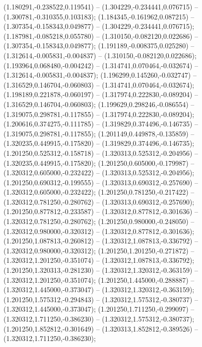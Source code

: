  (1.180291,-0.238522,0.119541) -- (1.304229,-0.234441,0.076715) -- (1.300781,-0.310355,0.103183);
 (1.184345,-0.161962,0.087215) -- (1.307354,-0.158343,0.049877) -- (1.304229,-0.234441,0.076715);
 (1.187981,-0.085218,0.055780) -- (1.310150,-0.082120,0.022686) -- (1.307354,-0.158343,0.049877);
 (1.191189,-0.008375,0.025280) -- (1.312614,-0.005831,-0.004837) -- (1.310150,-0.082120,0.022686);
 (1.193964,0.068480,-0.004242) -- (1.314741,0.070464,-0.032674) -- (1.312614,-0.005831,-0.004837);
 (1.196299,0.145260,-0.032747) -- (1.316529,0.146704,-0.060803) -- (1.314741,0.070464,-0.032674);
 (1.198189,0.221878,-0.060197) -- (1.317974,0.222830,-0.089204) -- (1.316529,0.146704,-0.060803);
 (1.199629,0.298246,-0.086554) -- (1.319075,0.298781,-0.117855) -- (1.317974,0.222830,-0.089204);
 (1.200616,0.374275,-0.111785) -- (1.319829,0.374496,-0.146735) -- (1.319075,0.298781,-0.117855);
 (1.201149,0.449878,-0.135859) -- (1.320235,0.449915,-0.175820) -- (1.319829,0.374496,-0.146735);
 (1.201250,0.525312,-0.158718) -- (1.320313,0.525312,-0.204956) -- (1.320235,0.449915,-0.175820);
 (1.201250,0.605000,-0.179987) -- (1.320312,0.605000,-0.232422) -- (1.320313,0.525312,-0.204956);
 (1.201250,0.690312,-0.199555) -- (1.320313,0.690312,-0.257690) -- (1.320312,0.605000,-0.232422);
 (1.201250,0.781250,-0.217422) -- (1.320312,0.781250,-0.280762) -- (1.320313,0.690312,-0.257690);
 (1.201250,0.877812,-0.233587) -- (1.320312,0.877812,-0.301636) -- (1.320312,0.781250,-0.280762);
 (1.201250,0.980000,-0.248050) -- (1.320312,0.980000,-0.320312) -- (1.320312,0.877812,-0.301636);
 (1.201250,1.087813,-0.260812) -- (1.320312,1.087813,-0.336792) -- (1.320312,0.980000,-0.320312);
 (1.201250,1.201250,-0.271872) -- (1.320312,1.201250,-0.351074) -- (1.320312,1.087813,-0.336792);
 (1.201250,1.320313,-0.281230) -- (1.320312,1.320312,-0.363159) -- (1.320312,1.201250,-0.351074);
 (1.201250,1.445000,-0.288887) -- (1.320312,1.445000,-0.373047) -- (1.320312,1.320312,-0.363159);
 (1.201250,1.575312,-0.294843) -- (1.320312,1.575312,-0.380737) -- (1.320312,1.445000,-0.373047);
 (1.201250,1.711250,-0.299097) -- (1.320312,1.711250,-0.386230) -- (1.320312,1.575312,-0.380737);
 (1.201250,1.852812,-0.301649) -- (1.320313,1.852812,-0.389526) -- (1.320312,1.711250,-0.386230);

